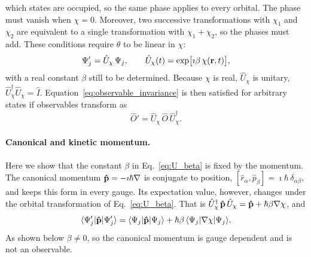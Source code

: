which states are occupied, so the same phase applies to every orbital. The
phase must vanish when $\chi = 0$. %
Moreover, two successive transformations with $\chi_1$ and $\chi_2$ are equivalent to a
single transformation with $\chi_1+\chi_2$, so the phases must add. These
conditions require $\theta$ to be linear in $\chi$:
\begin{equation}
  \Psi_j' = \hat U_\chi\,\Psi_j, \qquad
  \hat U_\chi(t) = \exp\!\big[\imath\beta\,\chi(\vb r,t)\big],
  \label{eq:U_beta}
\end{equation}
with a real constant $\beta$ still to be determined. Because $\chi$ is real,
$\hat U_\chi$ is unitary, $\hat U_\chi^\dagger\hat U_\chi = \hat I$.
Equation~\eqref{eq:observable_invariance} is then satisfied for arbitrary
states if observables transform as
\begin{equation}
  \hat O' = \hat U_\chi\,\hat O\,\hat U_\chi^\dagger .
  \label{eq:observable_rule}
\end{equation}


\paragraph{Canonical and kinetic momentum.}
Here we show that the constant $\beta$ in Eq.~\eqref{eq:U_beta} is fixed by the
momentum. The canonical momentum $\vb{\hat p} = -\imath\hbar\nabla$ is
conjugate to position, $[\hat r_\alpha,\hat p_\beta] = \imath\hbar\,\delta_{\alpha\beta}$,
and keeps this form in every gauge. Its expectation value, however, changes
under the orbital transformation of Eq.~\eqref{eq:U_beta}. That is 
$\hat U_\chi^\dagger\,\vb{\hat p}\,\hat U_\chi = \vb{\hat p} + \hbar\beta\nabla\chi$,
and
\begin{equation}
  \langle\Psi_j'|\vb{\hat p}|\Psi_j'\rangle
  = \langle\Psi_j|\vb{\hat p}|\Psi_j\rangle
  + \hbar\beta\,\langle\Psi_j|\nabla\chi|\Psi_j\rangle .
  \label{eq:p_shift}
\end{equation}
As shown below  $\beta\neq 0$, so  the canonical momentum is gauge dependent and
is not an observable.

